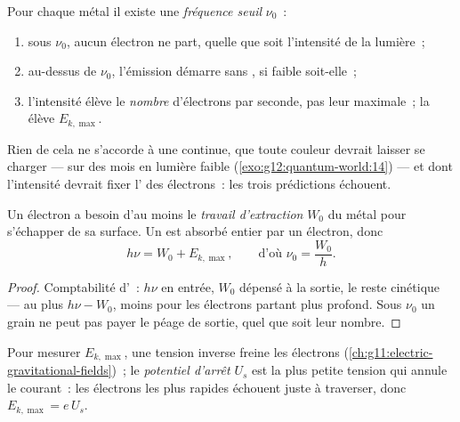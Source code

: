 \begin{proposition}\label{prop:g12:quantum-world:facts}
Pour chaque métal il existe une \emph{fréquence seuil} $\nu_0$~:
\begin{enumerate}
  \item sous $\nu_0$, aucun électron ne part, quelle que soit
        l'intensité de la lumière~;
  \item au-dessus de $\nu_0$, l'émission démarre sans
        , si faible soit-elle~;
  \item l'intensité élève le \emph{nombre} d'électrons par seconde,
        pas leur  maximale~; la
         élève $E_{k,\max}$.
\end{enumerate}
Rien de cela ne s'accorde à une  continue, que
toute couleur devrait laisser se charger --- sur des mois en lumière
faible (\cref{exo:g12:quantum-world:14}) --- et dont l'intensité devrait
fixer l' des électrons~: les trois
prédictions échouent.
\end{proposition}
\admitted

\begin{theorem}\label{thm:g12:quantum-world:einstein}
Un électron a besoin d'au moins le
\emph{travail d'extraction} $W_0$ du métal
pour s'échapper de sa surface. Un  est absorbé
entier par un électron, donc
\[
h\nu = W_0 + E_{k,\max}, \qquad \text{d'où } \nu_0 = \frac{W_0}{h}.
\]
\end{theorem}

\begin{proof}
Comptabilité d'~: $h\nu$ en entrée, $W_0$
dépensé à la sortie, le reste cinétique --- au plus $h\nu - W_0$,
moins pour les électrons partant plus profond. Sous $\nu_0$ un grain
ne peut pas payer le péage de sortie, quel que soit leur nombre.
\end{proof}

\begin{definition}\label{def:g12:quantum-world:stopping}
Pour mesurer $E_{k,\max}$, une tension inverse freine
les électrons (\cref{ch:g11:electric-gravitational-fields})~; le
\emph{potentiel d'arrêt} $U_s$ est la plus
petite tension qui annule le courant~: les
électrons les plus rapides échouent juste à traverser, donc
$E_{k,\max} = e\,U_s$.
\end{definition}

